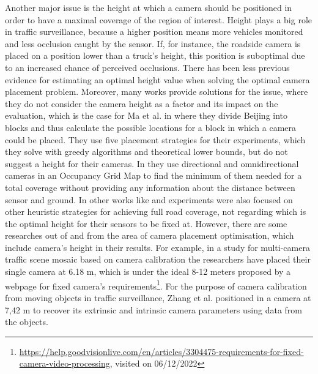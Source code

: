 Another major issue is the height at which a camera should be positioned in order to have a maximal coverage of the region of interest. Height plays a big role in traffic surveillance, because a higher position means more vehicles monitored and less occlusion caught by the sensor. If, for instance, the roadside camera is placed on a position lower than a truck's height, this position is suboptimal due to an increased chance of perceived occlusions. There has been less previous evidence for estimating an optimal height value when solving the optimal camera placement problem. Moreover, many works provide solutions for the issue, where they do not consider the camera height as a factor and its impact on the evaluation, which is the case for Ma et al. in \cite{surveillance_related_work} where they divide Beijing into blocks and thus calculate the possible locations for a block in which a camera could be placed. They use five placement strategies for their experiments, which they solve with greedy algorithms and theoretical lower bounds, but do not suggest a height for their cameras. In \cite{total_coverage_optimum} they use directional and omnidirectional cameras in an Occupancy Grid Map to find the minimum of them needed for a total coverage without providing any information about the distance between sensor and ground. In other works like \cite{max_camera_coverage} and \cite{genetic_alg} experiments were also focused on other heuristic strategies for achieving full road coverage, not regarding which is the optimal height for their sensors to be fixed at. However, there are some researches out of and from the area of camera placement optimisation, which include camera's height in their results. For example, in a study for multi-camera traffic scene mosaic based on camera calibration \cite{multi_camera_calib} the researchers have placed their single camera at 6.18 m, which is under the ideal 8-12 meters proposed by a webpage for fixed camera's requirements\footnote{\url{https://help.goodvisionlive.com/en/articles/3304475-requirements-for-fixed-camera-video-processing}, visited on 06/12/2022}. For the purpose of camera calibration from moving objects in traffic surveillance, Zhang et al. positioned in \cite{practical_camera_calib} a camera at 7,42 m to recover its extrinsic and intrinsic camera parameters using data from the objects.  

